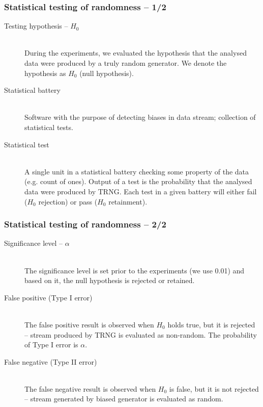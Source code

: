 \documentclass[aspectratio=169]{beamer}
\begin{document}
\begin{frame}
\frametitle{Statistical testing of randomness -- 1/2}

\begin{description}
\item[Testing hypothesis -- $H_0$] \hfill \\
During the experiments, we evaluated the hypothesis that the analysed data were
produced by a truly random generator. We denote the hypothesis as $H_0$ (null hypothesis).
\item[Statistical battery] \hfill \\
Software with the purpose of detecting biases in data stream; collection of statistical tests.
\item[Statistical test] \hfill \\
A single unit in a statistical battery checking some property of the data (e.g. count of ones). Output of a test is the probability that the analysed data were produced by TRNG. Each test in a given battery will either fail ($H_0$ rejection) or pass ($H_0$ retainment).
\end{description}

\end{frame}

\begin{frame}
\frametitle{Statistical testing of randomness -- 2/2}

\begin{description}
\item[Significance level -- $\alpha$] \hfill \\
The significance level is set prior to the experiments (we use 0.01) and based on it, the null hypothesis is rejected or retained.
\item[False positive (Type I error)] \hfill \\
The false positive result is observed when $H_0$ holds true, but it is rejected -- stream
produced by TRNG is evaluated as non-random. The probability of Type I error is $\alpha$.
\item[False negative (Type II error)] \hfill \\
The false negative result is observed when $H_0$ is false, but it is not rejected -- stream generated by biased generator is evaluated as random.
\end{description}
\end{frame}
\end{document}
